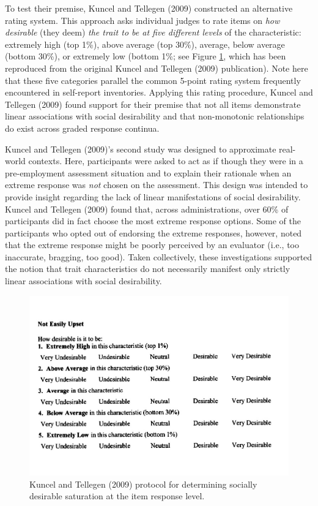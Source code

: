 \documentclass[
  ,jou]{apa6}
\begin{document}
To test their premise, Kuncel and Tellegen (2009) constructed an alternative rating system. This approach asks individual judges to rate items on \emph{how desirable} (they deem) \emph{the trait to be at five different levels} of the characteristic: extremely high (top 1\%), above average (top 30\%), average, below average (bottom 30\%), or extremely low (bottom 1\%; see Figure \ref{fig:Figure1}, which has been reproduced from the original Kuncel and Tellegen (2009) publication). Note here that these five categories parallel the common 5-point rating system frequently encountered in self-report inventories. Applying this rating procedure, Kuncel and Tellegen (2009) found support for their premise that not all items demonstrate linear associations with social desirability and that non-monotonic relationships do exist across graded response continua.

Kuncel and Tellegen (2009)'s second study was designed to approximate real-world contexts. Here, participants were asked to act as if though they were in a pre-employment assessment situation and to explain their rationale when an extreme response was \emph{not} chosen on the assessment. This design was intended to provide insight regarding the lack of linear manifestations of social desirability. Kuncel and Tellegen (2009) found that, across administrations, over 60\% of participants did in fact choose the most extreme response options. Some of the participants who opted out of endorsing the extreme responses, however, noted that the extreme response might be poorly perceived by an evaluator (i.e., too inaccurate, bragging, too good). Taken collectively, these investigations supported the notion that trait characteristics do not necessarily manifest only strictly linear associations with social desirability.

\begin{figure}
\centering
\includegraphics{KuncelTellegen_files/figure-latex/Figure1-1.pdf}
\caption{\label{fig:Figure1}Kuncel and Tellegen (2009) protocol for determining socially desirable saturation at the item response level.}
\end{figure}
\end{document}
